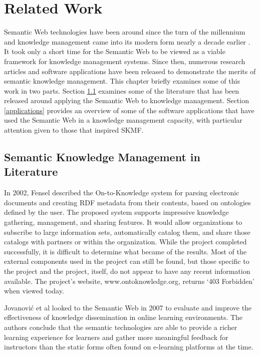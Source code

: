 \chapter{Related Work}
 
Semantic Web technologies have been around since the turn of the millennium and knowledge management came into its modern form nearly a decade earlier
\cite{japanesekm}.
It took only a short time for the Semantic Web to be viewed as a viable framework for knowledge management systems. Since then, numerous research articles and software applications have been released to demonstrate the merits of semantic knowledge management. This chapter briefly examines some of this work in two parts. Section
\ref{research}
examines some of the literature that has been released around applying the Semantic Web to knowledge management. Section
\ref{applications}
provides an overview of some of the software applications that have used the Semantic Web in a knowledge management capacity, with particular attention given to those that inspired SKMF.

 
\section{Semantic Knowledge Management in Literature}
\label{research}

In 2002, Fensel described the On-to-Knowledge
\cite{ontoknow}
system for parsing electronic documents and creating RDF metadata from their contents, based on ontologies defined by the user. The proposed system supports impressive knowledge gathering, management, and sharing features. It would allow organizations to subscribe to large information sets, automatically catalog them, and share those catalogs with partners or within the organization. While the project completed successfully, it is difficult to determine what became of the results. Most of the external components used in the project can still be found, but those specific to the project and the project, itself, do not appear to have any recent information available. The project's website, www.ontoknowledge.org, returns `403 Forbidden' when viewed today.

Jovanović et al
\cite{semanticlearning}
looked to the Semantic Web in 2007 to evaluate and improve the effectiveness of knowledge dissemination in online learning environments. The authors conclude that the semantic technologies are able to provide a richer learning experience for learners and gather more meaningful feedback for instructors than the static forms often found on e-learning platforms at the time.

